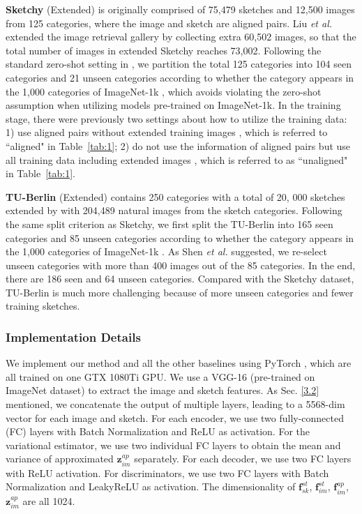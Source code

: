 \documentclass[10pt,twocolumn,letterpaper]{article}
\begin{document}
\textbf{Sketchy} (Extended) \cite{sangkloy2016sketchy} is originally comprised of 75,479 sketches and 12,500 images from 125 categories, where the image and sketch are aligned pairs. Liu \textit{et al.} \cite{liu2017deep} extended the image retrieval gallery by collecting extra 60,502 images, so that the total number of images in extended Sketchy reaches 73,002. Following the standard zero-shot setting in \cite{yelamarthi2018zero}, we partition the total 125 categories into 104 seen categories and 21 unseen categories according to whether the category appears in the 1,000 categories of ImageNet-1k \cite{deng2009imagenet}, which avoids violating the zero-shot assumption when utilizing models pre-trained on ImageNet-1k. In the training stage, there were previously two settings about how to utilize the training data: 1) use aligned pairs without extended training images \cite{yelamarthi2018zero}, which is referred to ``aligned" in Table~\ref{tab:1}; 2) do not use the information of aligned pairs but use all training data including extended images \cite{shen2018zero}, which is referred to as ``unaligned" in Table~\ref{tab:1}.

\textbf{TU-Berlin} (Extended) \cite{eitz2012hdhso} contains 250 categories with a total of 20, 000 sketches extended by \cite{liu2017deep} with 204,489 natural images from the sketch categories. Following the same split criterion as Sketchy, we first split the TU-Berlin into 165 seen categories and 85 unseen categories according to whether the category appears in the 1,000 categories of ImageNet-1k \cite{deng2009imagenet}. As Shen \textit{et al.} \cite{shen2018zero} suggested, we re-select unseen categories with more than 400 images out of the 85 categories. In the end, there are 186 seen and 64 unseen categories. Compared with the Sketchy dataset, TU-Berlin is much more challenging because of more unseen categories and fewer training sketches.

\subsubsection{Implementation Details}
We implement our method and all the other baselines using PyTorch \cite{paszke2017automatic}, which are all trained on one GTX 1080Ti GPU. We use a VGG-16 (pre-trained on ImageNet dataset) to extract the image and sketch features. As Sec. \ref{3.2} mentioned, we concatenate the output of multiple layers, leading to a 5568-dim vector for each image and sketch. For each encoder, we use two fully-connected (FC) layers with Batch Normalization and ReLU as activation. For the variational estimator, we use two individual FC layers to obtain the mean and variance of approximated $\mathbf{z}_{im}^{ap}$ separately. For each decoder, we use two FC layers with ReLU activation. For discriminators, we use two FC layers with Batch Normalization and LeakyReLU as activation. The dimensionality of $\mathbf{f}_{sk}^{st}$, $\mathbf{f}_{im}^{st}$, $\mathbf{f}_{im}^{ap}$, $\mathbf{z}_{im}^{ap}$ are all 1024.
\end{document}
